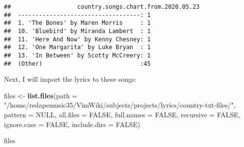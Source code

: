 \documentclass[]{article}
\newenvironment{Shaded}{\begin{snugshade}}{\end{snugshade}}
\newcommand{\DataTypeTok}[1]{\textcolor[rgb]{0.13,0.29,0.53}{#1}}
\newcommand{\KeywordTok}[1]{\textcolor[rgb]{0.13,0.29,0.53}{\textbf{#1}}}
\newcommand{\NormalTok}[1]{#1}
\newcommand{\OtherTok}[1]{\textcolor[rgb]{0.56,0.35,0.01}{#1}}
\newcommand{\StringTok}[1]{\textcolor[rgb]{0.31,0.60,0.02}{#1}}
\begin{document}
\begin{verbatim}
##                   country.songs.chart.from.2020.05.23
##  -----------------------------------: 1              
##  1. 'The Bones' by Maren Morris     : 1              
##  10. 'Bluebird' by Miranda Lambert  : 1              
##  11. 'Here And Now' by Kenny Chesney: 1              
##  12. 'One Margarita' by Luke Bryan  : 1              
##  13. 'In Between' by Scotty McCreery: 1              
##  (Other)                            :45
\end{verbatim}

Next, I will import the lyrics to these songs:

\begin{Shaded}
\begin{Highlighting}[]
\NormalTok{files <-}\StringTok{ }\KeywordTok{list.files}\NormalTok{(}\DataTypeTok{path =} \StringTok{"/home/redapemusic35/VimWiki/subjects/projects/lyrics/country-txt-files/"}\NormalTok{, }\DataTypeTok{pattern =} \OtherTok{NULL}\NormalTok{, }\DataTypeTok{all.files =} \OtherTok{FALSE}\NormalTok{, }\DataTypeTok{full.names =} \OtherTok{FALSE}\NormalTok{, }\DataTypeTok{recursive =} \OtherTok{FALSE}\NormalTok{, }\DataTypeTok{ignore.case =} \OtherTok{FALSE}\NormalTok{, }\DataTypeTok{include.dirs =} \OtherTok{FALSE}\NormalTok{)}

\NormalTok{files}
\end{Highlighting}
\end{Shaded}
\end{document}
